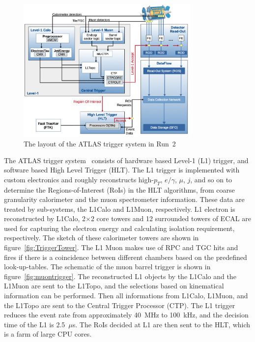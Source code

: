 \begin{figure}[tbp]
\begin{center}
 \includegraphics[width=0.8\textwidth,keepaspectratio]{figures/detector/Trigger}
\caption{
The layout of the ATLAS trigger system in Run~2
}
\label{fig:Trigger}
\end{center}
\end{figure}
The ATLAS trigger system~\cite{TRIG-2019-04} consists of hardware based Level-1 (L1) trigger, and software based High Level Trigger (HLT). 
The L1 trigger is implemented with custom electronics and roughly reconstructs high-$p_T$, $e/\gamma$, $\mu$, $j$, and so on to determine the Regions-of-Interest (RoIs) in the HLT algorithms, from coarse granularity calorimeter and the muon spectrometer information. 
These data are treated by sub-systems, the L1Calo and L1Muon, respectively. 
L1 electron is reconstructed by L1Calo, 2$\times$2 core towers and 12 surrounded towers of ECAL are used for capturing the electron energy and calculating isolation requirement, respectively. The sketch of these calorimeter towers are shown in figure~\ref{fig:TriggerTower}.
The L1 Muon makes use of RPC and TGC hits and fires if there is a coincidence between different chambers based on the predefined look-up-tables.
The schematic of the muon barrel trigger is shown in figure~\ref{fig:muontrigger}.
The reconstructed L1 objects by the L1Calo and the L1Muon are sent to the L1Topo, and the selections based on kinematical information can be performed. 
Then all informations from L1Calo, L1Muon, and the L1Topo are sent to the Central Trigger Processor (CTP). 
The L1 trigger reduces the event rate from approximately 40~MHz to 100~kHz, and the decision time of the L1 is 2.5~$\mu$s.
The RoIs decided at L1 are then sent to the HLT, which is a farm of large CPU cores.
